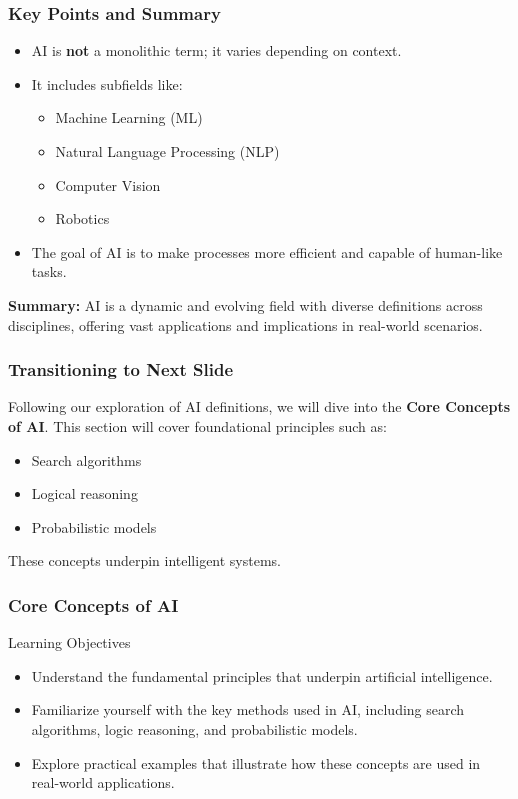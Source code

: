 \documentclass[aspectratio=169]{beamer}
\begin{document}
\begin{frame}[fragile]
    \frametitle{Key Points and Summary}
    
    \begin{itemize}
        \item AI is \textbf{not} a monolithic term; it varies depending on context.
        \item It includes subfields like:
        \begin{itemize}
            \item Machine Learning (ML)
            \item Natural Language Processing (NLP)
            \item Computer Vision
            \item Robotics
        \end{itemize}
        \item The goal of AI is to make processes more efficient and capable of human-like tasks.
    \end{itemize}
    
    \textbf{Summary:} AI is a dynamic and evolving field with diverse definitions across disciplines, offering vast applications and implications in real-world scenarios.
    
\end{frame}

\begin{frame}[fragile]
    \frametitle{Transitioning to Next Slide}
    
    Following our exploration of AI definitions, we will dive into the \textbf{Core Concepts of AI}. This section will cover foundational principles such as:
    \begin{itemize}
        \item Search algorithms
        \item Logical reasoning
        \item Probabilistic models
    \end{itemize}
    These concepts underpin intelligent systems.
    
\end{frame}

\begin{frame}[fragile]
    \frametitle{Core Concepts of AI}
    \begin{block}{Learning Objectives}
        \begin{itemize}
            \item Understand the fundamental principles that underpin artificial intelligence.
            \item Familiarize yourself with the key methods used in AI, including search algorithms, logic reasoning, and probabilistic models.
            \item Explore practical examples that illustrate how these concepts are used in real-world applications.
        \end{itemize}
    \end{block}
\end{frame}
\end{document}
